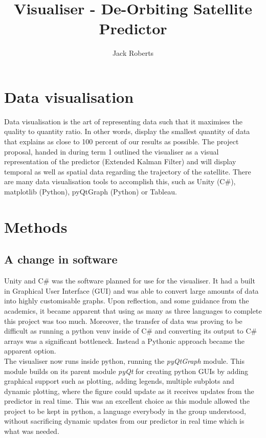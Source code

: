 \documentclass[12pt, a4paper]{article}
\begin{document}
\title{Visualiser - De-Orbiting Satellite Predictor}
\author{Jack Roberts}
\maketitle

\section{Data visualisation}
Data visualisation is the art of representing data such that it maximises the quality to quantity ratio. In other words, display the smallest quantity of data that explains as close to 100 percent of our results as possible. The project proposal, handed in during term 1 outlined the visualiser as a visual representation of the predictor (Extended Kalman Filter) and will display temporal as well as spatial data regarding the trajectory of the satellite. There are many data visualisation tools to accomplish this, such as Unity (C$\#$), matplotlib (Python), pyQtGraph (Python) or Tableau.
\section{Methods}
\subsection{A change in software}
Unity and C$\#$ was the software planned for use for the visualiser. It had a built in Graphical User Interface (GUI) and was able to convert large amounts of data into highly customisable graphs. Upon reflection, and some guidance from the academics, it became apparent that using as many as three languages to complete this project was too much. Moreover, the transfer of data was proving to be difficult as running a python venv inside of C$\#$ and converting its output to C$\#$ arrays was a significant bottleneck. Instead a Pythonic approach became the apparent option. \\
The visualiser now runs inside python, running the \textit{pyQtGraph} module. This module builds on its parent module \textit{pyQt} for creating python GUIs by adding graphical support such as plotting, adding legends, multiple subplots and dynamic plotting, where the figure could update as it receives updates from the predictor in real time. This was an excellent choice as this module allowed the project to be kept in python, a language everybody in the group understood, without sacrificing dynamic updates from our predictor in real time which is what was needed. 
\end{document}
